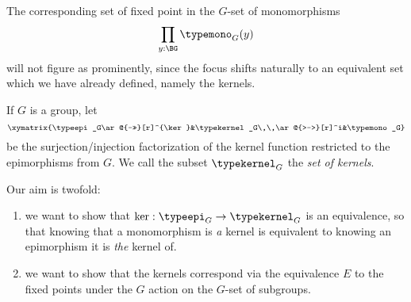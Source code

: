   The corresponding set of fixed point in the $G$-set of monomorphisms
  $$\prod_{y:\BG}\typemono_G(y)$$
will not figure as prominently, since the focus shifts naturally to an equivalent set which we have already defined, namely the kernels.
  \begin{definition}
    \label{def:setofkernels}
    If $G$ is a group, let
    $$\xymatrix{\typeepi_G\ar@{->>}[r]^{\ker}&\typekernel_G\,\,\ar@{>->}[r]^i&\typemono_G}$$
    be the surjection/injection factorization of the kernel function restricted to the epimorphisms from $G$.  We call the subset $\typekernel_G$ the \emph{set of kernels}.
  \end{definition}

  Our aim is twofold:
  \begin{enumerate}
  \item we want to show that $\ker:\typeepi_G\to\typekernel_G$ is an equivalence, so that knowing that a monomorphism is \emph{a} kernel is equivalent to knowing an epimorphism it is \emph{the} kernel of.
  \item we want to show that the kernels correspond via the equivalence $E$ to the fixed points under the $G$ action on the $G$-set of subgroups.
  \end{enumerate}




